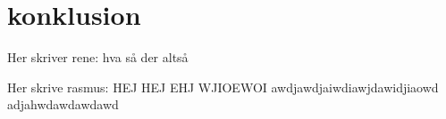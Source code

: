 \section{konklusion}
Her skriver rene:
hva så der altså

Her skrive rasmus:
HEJ HEJ EHJ WJIOEWOI
 awdjawdjaiwdiawjdawidjiaowd
 adjahwdawdawdawd
